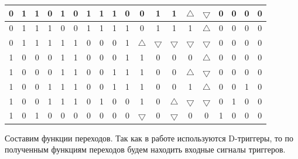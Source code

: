 \documentclass[a4paper,14pt]{article}
\begin{document}
\begin{landscape}
\begin{table}[H]
\begin{center}
\begin{tabular}{|c|c|c|c|c|c|c|c|c|c|c|c|c|c|c|c|c|c|c|}
			0 & 1 & 1 & 0 & 1 & 0 & 1 & 1 & 1 & 0 & 0 & 1 & 1 & $\bigtriangleup$ & $\bigtriangledown$ & 0 & 0 & 0 & 0 \\ \hline
			0 & 1 & 1 & 1 & 0 & 0 & 1 & 1 & 1 & 1 & 0 & 1 & 1 & 1 & $\bigtriangleup$ & 0 & 0 & 0 & 0 \\ \hline
			0 & 1 & 1 & 1 & 1 & 1 & 0 & 0 & 0 & 1 & $\bigtriangleup$ & $\bigtriangledown$ & $\bigtriangledown$ & $\bigtriangledown$ & $\bigtriangledown$ & 0 & 0 & 0 & 0 \\ \hline
			1 & 0 & 0 & 0 & 1 & 1 & 0 & 0 & 0 & 1 & 1 & 0 & 0 & 0 & $\bigtriangleup$ & 0 & 0 & 0 & 0 \\ \hline
			1 & 0 & 0 & 0 & 1 & 1 & 0 & 0 & 1 & 1 & 1 & 0 & 0 & $\bigtriangleup$ & $\bigtriangledown$ & 0 & 0 & 0 & 0 \\ \hline
			1 & 0 & 0 & 1 & 1 & 1 & 0 & 0 & 1 & 1 & 1 & 0 & 0 & 1 & $\bigtriangleup$ & 0 & 0 & 1 & 0 \\ \hline
			1 & 0 & 0 & 1 & 1 & 1 & 0 & 1 & 0 & 0 & 1 & 0 & $\bigtriangleup$ & $\bigtriangledown$ & $\bigtriangledown$ & 0 & 1 & 0 & 0 \\ \hline
			1 & 0 & 1 & 0 & 0 & 0 & 0 & 0 & 0 & 0 & $\bigtriangledown$ & 0 & $\bigtriangledown$ & 0 & 0 & 1 & 0 & 0 & 0 \\ \hline
		\end{tabular}

\end{center}
\end{table}
\end{landscape}

Составим функции переходов. Так как в работе используются D-триггеры, то по полученным функциям переходов будем находить входные сигналы триггеров.

\end{document}
